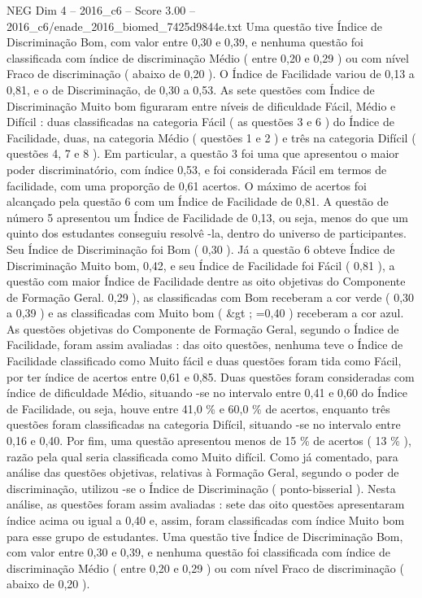 \begin{textsample}{NEG Dim 4 – 2016\_c6 – Score 3.00 – 2016\_c6/enade\_2016\_biomed\_7425d9844e.txt}
Uma questão tive Índice de Discriminação Bom, com valor entre 0,30 e 0,39, e nenhuma questão foi classificada com índice de discriminação Médio ( entre 0,20 e 0,29 ) ou com nível Fraco de discriminação ( abaixo de 0,20 ).
O Índice de Facilidade variou de 0,13 a 0,81, e o de Discriminação, de 0,30 a 0,53.
As sete questões com Índice de Discriminação Muito bom figuraram entre níveis de dificuldade Fácil, Médio e Difícil : duas classificadas na categoria Fácil ( as questões 3 e 6 ) do Índice de Facilidade, duas, na categoria Médio ( questões 1 e 2 ) e três na categoria Difícil ( questões 4, 7 e 8 ).
Em particular, a questão 3 foi uma que apresentou o maior poder discriminatório, com índice 0,53, e foi considerada Fácil em termos de facilidade, com uma proporção de 0,61 acertos.
O máximo de acertos foi alcançado pela questão 6 com um Índice de Facilidade de 0,81.
A questão de número 5 apresentou um Índice de Facilidade de 0,13, ou seja, menos do que um quinto dos estudantes conseguiu resolvê -la, dentro do universo de participantes.
Seu Índice de Discriminação foi Bom ( 0,30 ).
Já a questão 6 obteve Índice de Discriminação Muito bom, 0,42, e seu Índice de Facilidade foi Fácil ( 0,81 ), a questão com maior Índice de Facilidade dentre as oito objetivas do Componente de Formação Geral. 0,29 ), as classificadas com Bom receberam a cor verde ( 0,30 a 0,39 ) e as classificadas com Muito bom ( \&gt ; =0,40 ) receberam a cor azul.
As questões objetivas do Componente de Formação Geral, segundo o Índice de Facilidade, foram assim avaliadas : das oito questões, nenhuma teve o Índice de Facilidade classificado como Muito fácil e duas questões foram tida como Fácil, por ter índice de acertos entre 0,61 e 0,85.
Duas questões foram consideradas com índice de dificuldade Médio, situando -se no intervalo entre 0,41 e 0,60 do Índice de Facilidade, ou seja, houve entre 41,0 \% e 60,0 \% de acertos, enquanto três questões foram classificadas na categoria Difícil, situando -se no intervalo entre 0,16 e 0,40.
Por fim, uma questão apresentou menos de 15 \% de acertos ( 13 \% ), razão pela qual seria classificada como Muito difícil.
Como já comentado, para análise das questões objetivas, relativas à Formação Geral, segundo o poder de discriminação, utilizou -se o Índice de Discriminação ( ponto-bisserial ).
Nesta análise, as questões foram assim avaliadas : sete das oito questões apresentaram índice acima ou igual a 0,40 e, assim, foram classificadas com índice Muito bom para esse grupo de estudantes.
Uma questão tive Índice de Discriminação Bom, com valor entre 0,30 e 0,39, e nenhuma questão foi classificada com índice de discriminação Médio ( entre 0,20 e 0,29 ) ou com nível Fraco de discriminação ( abaixo de 0,20 ).

\end{textsample}
